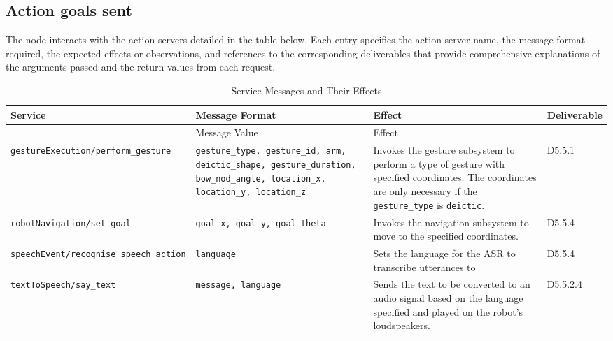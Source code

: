 \documentclass{CSSRforAfrica}
\begin{document}
\newpage
\subsection{Action goals sent}
The node interacts with the action servers detailed in the table below. Each entry specifies the action server name, the message format required, the expected effects or observations, and references to the corresponding deliverables that provide comprehensive explanations of the arguments passed and the return values from each request.

{\fontsize{9pt}{12pt}\selectfont
\begin{longtable}[c]{|p{6.4cm}|p{2.9cm}|p{3cm}|p{1.4cm}|}
    \caption{Service Messages and Their Effects} \label{tab:service_messages}\\
    \hline
    \rowcolor{gray!30}
    \textnormal{Service} & \textnormal{Message Format} & \textnormal{Effect}& \textnormal{Deliverable}  \\ \hline
    \endfirsthead
    \hline
    \rowcolor{gray!30}
     & \textnormal{Message Value} & \textnormal{Effect} \\ \hline
    \endhead

    \texttt{\footnotesize gestureExecution/perform\_gesture} & \texttt{\footnotesize gesture\_type, gesture\_id, arm, deictic\_shape, gesture\_duration, bow\_nod\_angle, location\_x, location\_y, location\_z} & Invokes the gesture subsystem to perform a type of gesture with specified coordinates. The coordinates are only necessary if the \texttt{\footnotesize gesture\_type} is \texttt{\footnotesize deictic}. &D5.5.1 \\ \hline
    \texttt{\footnotesize robotNavigation/set\_goal} & \texttt{\footnotesize goal\_x, goal\_y, goal\_theta} & Invokes the navigation subsystem to move to the specified coordinates. &D5.5.4 \\ \hline
    \texttt{\footnotesize speechEvent/recognise\_speech\_action} & \texttt{\footnotesize language} & Sets the language for the ASR to transcribe utterances to &D5.5.4 \\ \hline
    \texttt{\footnotesize textToSpeech/say\_text} & \texttt{\footnotesize message, language} & Sends the text to be converted to an audio signal based on the language specified and played on the robot's loudspeakers. &D5.5.2.4 \\ \hline

\end{longtable}
}
\end{document}
